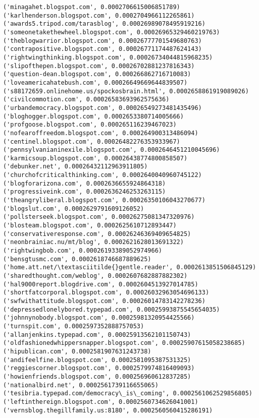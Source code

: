\documentclass[11pt]{article}
\begin{document}
\begin{Verbatim}[commandchars=\\\{\}]
('minagahet.blogspot.com', 0.0002706615006851789)
('karlhenderson.blogspot.com', 0.0002704966112265861)
('awards5.tripod.com/tarasblog', 0.00026989078495919216)
('someonetakethewheel.blogspot.com', 0.00026965329460219763)
('theblogwarrior.blogspot.com', 0.00026777701549680763)
('contrapositive.blogspot.com', 0.00026771174487624143)
('rightwingthinking.blogspot.com', 0.00026734044815968235)
('slipofthepen.blogspot.com', 0.00026702881237816343)
('question-dean.blogspot.com', 0.000266862716710083)
('loveamericahatebush.com', 0.00026649669644839507)
('s88172659.onlinehome.us/spockosbrain.html', 0.0002658861919089026)
('civilcommotion.com', 0.00026583693962575636)
('urbandemocracy.blogspot.com', 0.00026549273481435496)
('bloghogger.blogspot.com', 0.0002653380714005666)
('profgoose.blogspot.com', 0.000265116239467023)
('nofearoffreedom.blogspot.com', 0.000264900313486094)
('centinel.blogspot.com', 0.00026482276353933967)
('pennsylvanianinexile.blogspot.com', 0.0002646451210045696)
('karmicsoup.blogspot.com', 0.00026438774800858507)
('debunker.net', 0.00026432112963911805)
('churchofcriticalthinking.com', 0.0002640040960745122)
('blogforarizona.com', 0.0002636655924864318)
('progressiveink.com', 0.0002636246253263115)
('theangryliberal.blogspot.com', 0.00026350106043270677)
('blogslut.com', 0.0002629791609126052)
('pollsterseek.blogspot.com', 0.00026275081347320976)
('blosteam.blogspot.com', 0.0002625610712893447)
('conservativeresponse.com', 0.00026246369409654825)
('neonbrainiac.nu/mt/blog', 0.0002621628013691322)
('rightwingbob.com', 0.00026193389052974966)
('bensgtusmc.com', 0.0002618746687889625)
('home.att.net/\textasciitilde{}gentle.reader', 0.0002613851506845129)
('sharedthought.com/weblog', 0.0002607682887882302)
('hal9000report.blogdrive.com', 0.0002604513927014785)
('shortfatcorporal.blogspot.com', 0.00026032963054696133)
('swfwithattitude.blogspot.com', 0.00026014783142278236)
('depressedlonelybored.typepad.com', 0.00025993875545654035)
('johnnynobody.blogspot.com', 0.00025981320954425566)
('turnspit.com', 0.0002597352888757053)
('allanjenkins.typepad.com', 0.00025913562101150743)
('oldfashionedwhippersnapper.blogspot.com', 0.00025907615058238685)
('hipublican.com', 0.0002581907631243738)
('andifeelfine.blogspot.com', 0.0002581095387531325)
('reggiescorner.blogspot.com', 0.0002579974816409093)
('howienfriends.blogspot.com', 0.000256960612837285)
('nationalbird.net', 0.0002561739116655065)
('tesibria.typepad.com/democracy\_is\_coming', 0.0002561062529856805)
('leftinthereign.blogspot.com', 0.0002560734626041001)
('vernsblog.thegillfamily.us:8180', 0.0002560560415286191)

\end{Verbatim}
\end{document}
